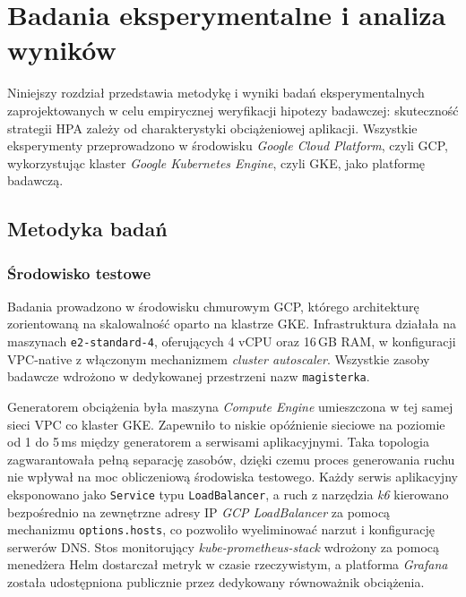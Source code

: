 \chapter{Badania eksperymentalne i analiza wyników}

Niniejszy rozdział przedstawia metodykę i wyniki badań eksperymentalnych zaprojektowanych w celu empirycznej weryfikacji hipotezy badawczej: skuteczność strategii HPA zależy od charakterystyki obciążeniowej aplikacji. Wszystkie eksperymenty przeprowadzono w środowisku \textit{Google Cloud Platform}, czyli GCP, wykorzystując klaster \textit{Google Kubernetes Engine}, czyli GKE, jako platformę badawczą.

\section{Metodyka badań}

\subsection{Środowisko testowe}

Badania prowadzono w środowisku chmurowym GCP, którego architekturę zorientowaną na skalowalność oparto na klastrze GKE. Infrastruktura działała na maszynach \texttt{e2-standard-4}, oferujących 4 vCPU oraz 16\,GB RAM, w konfiguracji VPC-native z włączonym mechanizmem \textit{cluster autoscaler}. Wszystkie zasoby badawcze wdrożono w dedykowanej przestrzeni nazw \texttt{magisterka}.

Generatorem obciążenia była maszyna \textit{Compute Engine} umieszczona w tej samej sieci VPC co klaster GKE. Zapewniło to niskie opóźnienie sieciowe na poziomie od 1 do 5\,ms między generatorem a serwisami aplikacyjnymi. Taka topologia zagwarantowała pełną separację zasobów, dzięki czemu proces generowania ruchu nie wpływał na moc obliczeniową środowiska testowego. Każdy serwis aplikacyjny eksponowano jako \texttt{Service} typu \texttt{LoadBalancer}, a ruch z narzędzia \textit{k6} kierowano bezpośrednio na zewnętrzne adresy IP \textit{GCP LoadBalancer} za pomocą mechanizmu \texttt{options.hosts}, co pozwoliło wyeliminować narzut i konfigurację serwerów DNS. Stos monitorujący \textit{kube-prometheus-stack} wdrożony za pomocą menedżera Helm dostarczał metryk w czasie rzeczywistym, a platforma \textit{Grafana} została udostępniona publicznie przez dedykowany równoważnik obciążenia.

